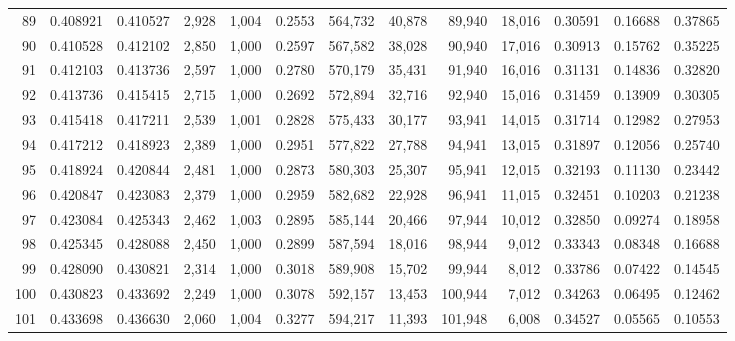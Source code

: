 \begin{tabular}{rrrrrrrrrrrrr}
89  &  0.408921 &  0.410527 &   2,928 &  1,004 &                                     0.2553 &  564,732 &   40,878 &   89,940 &   18,016 &  0.30591 &  0.16688 &  0.37865 \\
90  &  0.410528 &  0.412102 &   2,850 &  1,000 &                                     0.2597 &  567,582 &   38,028 &   90,940 &   17,016 &  0.30913 &  0.15762 &  0.35225 \\
91  &  0.412103 &  0.413736 &   2,597 &  1,000 &                                     0.2780 &  570,179 &   35,431 &   91,940 &   16,016 &  0.31131 &  0.14836 &  0.32820 \\
92  &  0.413736 &  0.415415 &   2,715 &  1,000 &                                     0.2692 &  572,894 &   32,716 &   92,940 &   15,016 &  0.31459 &  0.13909 &  0.30305 \\
93  &  0.415418 &  0.417211 &   2,539 &  1,001 &                                     0.2828 &  575,433 &   30,177 &   93,941 &   14,015 &  0.31714 &  0.12982 &  0.27953 \\
94  &  0.417212 &  0.418923 &   2,389 &  1,000 &                                     0.2951 &  577,822 &   27,788 &   94,941 &   13,015 &  0.31897 &  0.12056 &  0.25740 \\
95  &  0.418924 &  0.420844 &   2,481 &  1,000 &                                     0.2873 &  580,303 &   25,307 &   95,941 &   12,015 &  0.32193 &  0.11130 &  0.23442 \\
96  &  0.420847 &  0.423083 &   2,379 &  1,000 &                                     0.2959 &  582,682 &   22,928 &   96,941 &   11,015 &  0.32451 &  0.10203 &  0.21238 \\
97  &  0.423084 &  0.425343 &   2,462 &  1,003 &                                     0.2895 &  585,144 &   20,466 &   97,944 &   10,012 &  0.32850 &  0.09274 &  0.18958 \\
98  &  0.425345 &  0.428088 &   2,450 &  1,000 &                                     0.2899 &  587,594 &   18,016 &   98,944 &    9,012 &  0.33343 &  0.08348 &  0.16688 \\
99  &  0.428090 &  0.430821 &   2,314 &  1,000 &                                     0.3018 &  589,908 &   15,702 &   99,944 &    8,012 &  0.33786 &  0.07422 &  0.14545 \\
100 &  0.430823 &  0.433692 &   2,249 &  1,000 &                                     0.3078 &  592,157 &   13,453 &  100,944 &    7,012 &  0.34263 &  0.06495 &  0.12462 \\
101 &  0.433698 &  0.436630 &   2,060 &  1,004 &                                     0.3277 &  594,217 &   11,393 &  101,948 &    6,008 &  0.34527 &  0.05565 &  0.10553 \\

\end{tabular}

